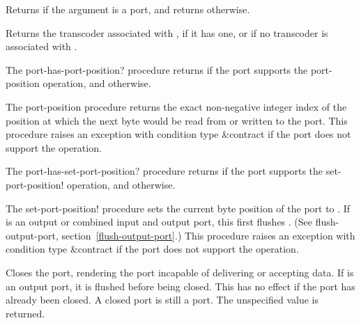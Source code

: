 \begin{entry}{%
}
   
Returns \schtrue{} if the argument is a port, and returns \schfalse{}
otherwise.
\end{entry}

\begin{entry}{%
}

Returns the transcoder associated with , if it has one,
or \schfalse{} if no transcoder is associated with .
\end{entry}

\begin{entry}{%
}

The {\cf port-has-port-position?} procedure returns \schtrue{} if the
port supports the {\cf port-position} operation, and \schfalse{}
otherwise.

The {\cf port-position} procedure
returns the exact non-negative integer index of the position at which the
next byte would be read from or written to the port.
This procedure raises an exception with condition type {\cf\&contract}
if the port does not support the operation.
\end{entry}   

\begin{entry}{%
}

   
The {\cf port-has-set-port-position?} procedure returns \schtrue{} if the port
supports the {\cf set-port-position!} operation, and \schfalse{}
otherwise.
   
The {\cf set-port-position!} procedure sets the current byte position
of the port to .  If  is an output or combined
input and output port, this first flushes .  (See {\cf
  flush-output-port}, section~\ref{flush-output-port}.)
This procedure raises an exception with condition type {\cf\&contract}
if the port does not support the operation.
\end{entry}

\begin{entry}{%
}
   
Closes the port, rendering the port incapable of delivering or
accepting data. If  is an output port, it is flushed before
being closed.  This has no effect if the port has already been closed.
A closed port is still a port. The unspecified value is returned.
\end{entry}


